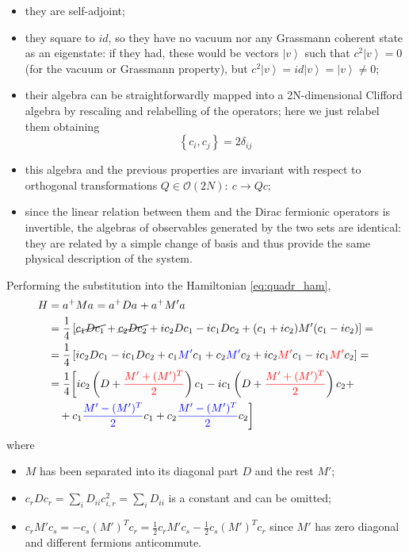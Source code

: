 \documentclass[a4paper,11pt]{article}
\theoremstyle{remark}
\newcommand{\ket}[1]{\left | #1 \right \rangle}
\newcommand{\nl}{\vskip 0.3cm}
\newcommand*{\mathcolor}{}  %
\def\mathcolor#1#{\mathcoloraux{#1}}
\newcommand*{\mathcoloraux}[3]{%
  \protect\leavevmode
  \begingroup
    \color#1{#2}#3%
  \endgroup
}
\begin{document}
   \begin{itemize}
   \item they are self-adjoint;
   \item they square to $id$, so they have no vacuum nor any Grassmann coherent state as an eigenstate: if they had, these would be vectors $\ket{v}$ such that $c^2\ket{v}=0$ (for the vacuum or Grassmann property), but $c^2\ket{v}=id\ket{v}=\ket{v}\neq 0$;
   \item their algebra can be straightforwardly mapped into a 2N-dimensional Clifford algebra by rescaling and relabelling of the operators; here we just relabel them obtaining 
   \begin{equation}
    \left\{c_{i},c_{j}\right\} = 2\delta_{ij}
    \label{eq:algebra_majorana}
   \end{equation}
   \item this algebra and the previous properties are invariant with respect to orthogonal transformations $Q\in\mathcal{O}(2N):\ c\rightarrow Qc$;
   \item since the linear relation between them and the Dirac fermionic operators is invertible, the algebras of observables generated by the two sets are identical: they are related by a simple change of basis and thus provide the same physical description of the system.
   \end{itemize}
   Performing the substitution into the Hamiltonian \eqref{eq:quadr_ham},
    \begin{align*}
     H &= a^+Ma^{ } = a^+Da^{ } + a^+M'a^{ }\notag\\
       &=\frac{1}{4}\left[\cancel{c_1Dc_1} + \cancel{c_2Dc_2} +ic_2Dc_1-ic_1Dc_2+(c_1+ic_2)M'(c_1-ic_2)\right] =  \notag\\
       &=\frac{1}{4}\left[ic_2Dc_1-ic_1Dc_2+c_1\mathcolor{blue}{M'}c_1 + c_2\mathcolor{blue}{M'}c_2 +ic_2\mathcolor{red}{M'}c_1-ic_1\mathcolor{red}{M'}c_2\right]=\notag \\
       &=\frac{1}{4}\bigg[ic_2\left(D+\mathcolor{red}{\frac{M'+(M')^T}{2}}\right)c_1-ic_1\left(D+\mathcolor{red}{\frac{M'+(M')^T}{2}}\right)c_2 +\notag\\
       &\ \ \ +c_1\mathcolor{blue}{\frac{M'-(M')^T}{2}}c_1+c_2\mathcolor{blue}{\frac{M'-(M')^T}{2}}c_2\bigg]\notag
    \end{align*}
    where \begin{itemize}
           \item $M$ has been separated into its diagonal part $D$ and the rest $\displaystyle M'$;
           \item $c_rDc_r = \sum_iD_{ii}c_{i,r}^2 = \sum_i D_{ii}$ is a constant and can be omitted;
           \item $\displaystyle c_rM'c_s = - c_s(M')^Tc_r = \frac{1}{2}c_rM'c_s - \frac{1}{2}c_s(M')^Tc_r$ since $M'$ has zero diagonal and different fermions anticommute.\nl
          \end{itemize}
\end{document}
